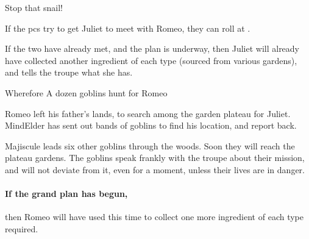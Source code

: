 \begin{speechtext}
  Stop that snail!
\end{speechtext}

If the \glspl{pc} try to get Juliet to meet with Romeo,
they can roll  at \tn[5].

If the two have already met, and the plan is underway,
then Juliet will already have collected another \gls{ingredient} of each type (sourced from various gardens), and tells the troupe what she has.

{Wherefore}%
{A dozen goblins hunt for Romeo}%

Romeo left his father's lands, to search among the garden plateau for Juliet.
\Gls{MindElder} has sent out bands of goblins to find his location, and report back.

Majiscule leads six other goblins through the woods.
Soon they will reach the plateau gardens.
The goblins speak frankly with the troupe about their mission, and will not deviate from it, even for a moment, unless their lives are in danger.

\paragraph{If the grand plan has begun,}
then Romeo will have used this time to collect one more \gls{ingredient} of each type required.

